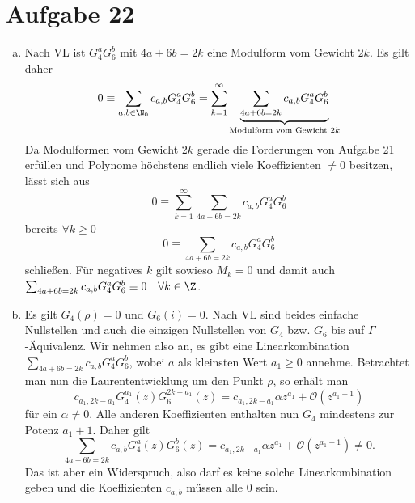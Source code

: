\documentclass{article}
\begin{document}
  \section*{Aufgabe 22}
  \begin{enumerate}[(a)]
    \item Nach VL ist $G_4^a G_6^b$ mit $4a + 6b = 2k$ eine Modulform vom Gewicht $2k$. Es gilt daher
    \[
        0 \equiv \sum_{a,b \in \N_0} c_{a,b} G_4^a G_6^b = \sum_{k = 1}^{\infty} \underbrace{\sum_{4a + 6b = 2k} c_{a,b} G_4^a G_6^b}_{\text{Modulform vom Gewicht }2k}
    \]
    Da Modulformen vom Gewicht $2k$ gerade die Forderungen von Aufgabe 21 erfüllen und Polynome höchstens endlich viele Koeffizienten $\neq 0$ besitzen, lässt sich aus
    \[
        0 \equiv \sum_{k = 1}^{\infty} \sum_{4a + 6b = 2k} c_{a,b} G_4^a G_6^b
    \]
    bereits $\forall k \geq 0$
    \[
        0 \equiv \sum_{4a + 6b = 2k} c_{a,b} G_4^a G_6^b
    \]
    schließen. Für negatives $k$ gilt sowieso $M_k = 0$ und damit auch $\sum_{4a + 6b = 2k} c_{a,b}G_4^aG_6^b \equiv 0 \quad \forall k \in \Z$.
    \item Es gilt $G_4(\rho) = 0$ und $G_6(i) = 0$. Nach VL sind beides einfache Nullstellen und auch die einzigen Nullstellen von $G_4$ bzw. $G_6$ bis auf $\Gamma$-Äquivalenz.
    Wir nehmen also an, es gibt eine Linearkombination $\sum_{4a + 6b = 2k} c_{a,b} G_4^a G_6^b$, wobei $a$ als kleinsten Wert $a_1 \geq 0$ annehme. 
    Betrachtet man nun die Laurententwicklung um den Punkt $\rho$, so erhält man
    \[
      c_{a_1,2k - a_1} G_4^{a_1}(z) G_6^{2k-a_1}(z) = c_{a_1,2k - a_1} \alpha z^{a_1} + \mathcal{O}(z^{a_1 + 1})
    \]
    für ein $\alpha \neq 0$. Alle anderen Koeffizienten enthalten nun $G_4$ mindestens zur Potenz $a_1 + 1$. Daher gilt
    \[
      \sum_{4a + 6b = 2k} c_{a,b} G_4^a(z) G_6^b(z) = c_{a_1,2k - a_1} \alpha z^{a_1} + \mathcal{O}(z^{a_1 + 1}) \neq 0.
    \]
    Das ist aber ein Widerspruch, also darf es keine solche Linearkombination geben und die Koeffizienten $c_{a,b}$ müssen alle $0$ sein.
  \end{enumerate}
\end{document}
